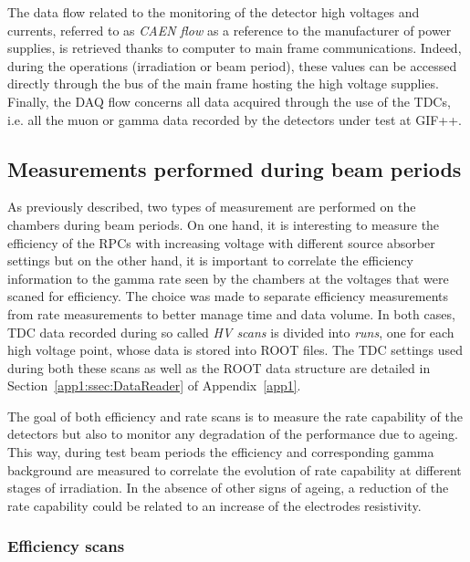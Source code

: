 	The data flow related to the monitoring of the detector high voltages and currents, referred to as \textit{CAEN flow} as a reference to the manufacturer of power supplies, is retrieved thanks to computer to main frame communications. Indeed, during the operations (irradiation or beam period), these values can be accessed directly through the bus of the main frame hosting the high voltage supplies. Finally, the DAQ flow concerns all data acquired through the use of the TDCs, i.e. all the muon or gamma data recorded by the detectors under test at GIF++.

	\subsection{Measurements performed during beam periods}
	\label{chapt5:ssec:beamperiods}
	
	As previously described, two types of measurement are performed on the chambers during beam periods. On one hand, it is interesting to measure the efficiency of the RPCs with increasing voltage with different source absorber settings but on the other hand, it is important to correlate the efficiency information to the gamma rate seen by the chambers at the voltages that were scaned for efficiency. The choice was made to separate efficiency measurements from rate measurements to better manage time and data volume. In both cases, TDC data recorded during so called \textit{HV scans} is divided into \textit{runs}, one for each high voltage point, whose data is stored into ROOT files. The TDC settings used during both these scans as well as the ROOT data structure are detailed in Section~\ref{app1:ssec:DataReader} of Appendix~\ref{app1}.
	
	The goal of both efficiency and rate scans is to measure the rate capability of the detectors but also to monitor any degradation of the performance due to ageing. This way, during test beam periods the efficiency and corresponding gamma background are measured to correlate the evolution of rate capability at different stages of irradiation. In the absence of other signs of ageing, a reduction of the rate capability could be related to an increase of the electrodes resistivity.
	
		\subsubsection{Efficiency scans}
		\label{chapt5:sssec:effscan}
	
